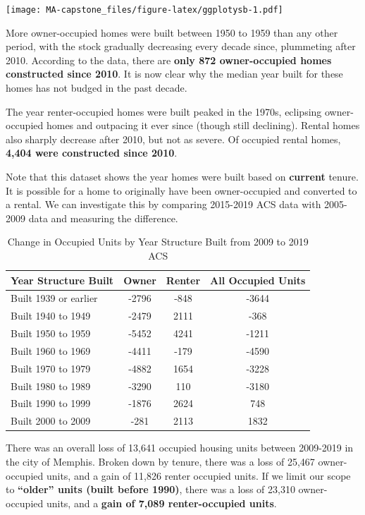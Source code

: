 \documentclass[
]{book}
\begin{document}
\texttt{[image: MA-capstone\_files/figure-latex/ggplotysb-1.pdf]}

More owner-occupied homes were built between 1950 to 1959 than any other period, with the stock gradually decreasing every decade since, plummeting after 2010. According to the data, there are \textbf{only 872 owner-occupied homes constructed since 2010}. It is now clear why the median year built for these homes has not budged in the past decade.

The year renter-occupied homes were built peaked in the 1970s, eclipsing owner-occupied homes and outpacing it ever since (though still declining). Rental homes also sharply decrease after 2010, but not as severe. Of occupied rental homes, \textbf{4,404 were constructed since 2010}.

Note that this dataset shows the year homes were built based on \textbf{current} tenure. It is possible for a home to originally have been owner-occupied and converted to a rental. We can investigate this by comparing 2015-2019 ACS data with 2005-2009 data and measuring the difference.

\begin{table}

\caption{\label{tab:tbl-yrblt-diff}Change in Occupied Units by Year Structure Built from 2009 to 2019 ACS}
\centering
\begin{tabular}[t]{l|c|c|c}
\hline
Year Structure Built & Owner & Renter & All Occupied Units\\
\hline
Built 1939 or earlier & -2796 & -848 & -3644\\
\hline
Built 1940 to 1949 & -2479 & 2111 & -368\\
\hline
Built 1950 to 1959 & -5452 & 4241 & -1211\\
\hline
Built 1960 to 1969 & -4411 & -179 & -4590\\
\hline
Built 1970 to 1979 & -4882 & 1654 & -3228\\
\hline
Built 1980 to 1989 & -3290 & 110 & -3180\\
\hline
Built 1990 to 1999 & -1876 & 2624 & 748\\
\hline
Built 2000 to 2009 & -281 & 2113 & 1832\\
\hline
\end{tabular}
\end{table}

There was an overall loss of 13,641 occupied housing units between 2009-2019 in the city of Memphis. Broken down by tenure, there was a loss of 25,467 owner-occupied units, and a gain of 11,826 renter occupied units. If we limit our scope to \textbf{``older'' units (built before 1990)}, there was a loss of 23,310 owner-occupied units, and a \textbf{gain of 7,089 renter-occupied units}.
\end{document}
